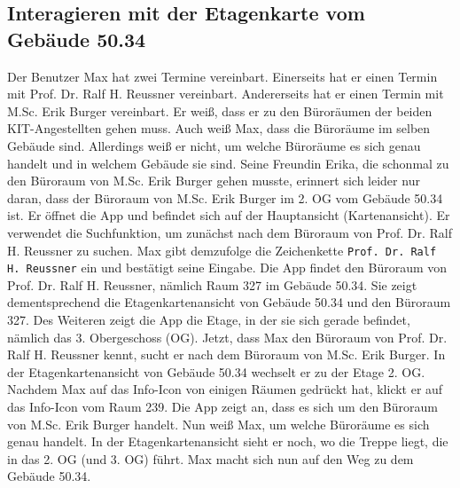 \subsection{Interagieren mit der Etagenkarte vom Gebäude 50.34}

Der \Gls{Benutzer} Max hat zwei Termine vereinbart.
Einerseits hat er einen Termin mit Prof. Dr. Ralf H. Reussner vereinbart.
Andererseits hat er einen Termin mit M.Sc. Erik Burger vereinbart.
Er weiß, dass er zu den Büroräumen der beiden \Gls{KIT}-Angestellten gehen muss.
Auch weiß Max, dass die Büroräume im selben Gebäude sind.
Allerdings weiß er nicht, um welche Büroräume es sich genau handelt und in welchem Gebäude sie sind.
Seine Freundin Erika, die schonmal zu den Büroraum von M.Sc. Erik Burger gehen musste, erinnert sich leider nur daran, dass der Büroraum von M.Sc. Erik Burger im 2. OG vom Gebäude 50.34 ist.
Er öffnet die App und befindet sich auf der Hauptansicht (\Gls{Kartenansicht}).
Er verwendet die Suchfunktion, um zunächst nach dem Büroraum von Prof. Dr. Ralf H. Reussner zu suchen.
Max gibt demzufolge die \Gls{Zeichenkette} \texttt{Prof. Dr. Ralf H. Reussner} ein und bestätigt seine Eingabe.
Die App findet den Büroraum von Prof. Dr. Ralf H. Reussner, nämlich Raum 327 im Gebäude 50.34.
Sie zeigt dementsprechend die \Gls{Etagenkartenansicht} von Gebäude 50.34 und den Büroraum 327.
Des Weiteren zeigt die App die Etage, in der sie sich gerade befindet, nämlich das 3. Obergeschoss (OG).
Jetzt, dass Max den Büroraum von Prof. Dr. Ralf H. Reussner kennt, sucht er nach dem Büroraum von M.Sc. Erik Burger.
In der \Gls{Etagenkartenansicht} von Gebäude 50.34 wechselt er zu der Etage 2. OG.
Nachdem Max auf das Info-\Gls{Icon} von einigen Räumen gedrückt hat, klickt er auf das Info-\Gls{Icon} vom Raum 239.
Die App zeigt an, dass es sich um den Büroraum von M.Sc. Erik Burger handelt.
Nun weiß Max, um welche Büroräume es sich genau handelt.
In der \Gls{Etagenkartenansicht} sieht er noch, wo die Treppe liegt, die in das 2. OG (und 3. OG) führt.
Max macht sich nun auf den Weg zu dem Gebäude 50.34.
